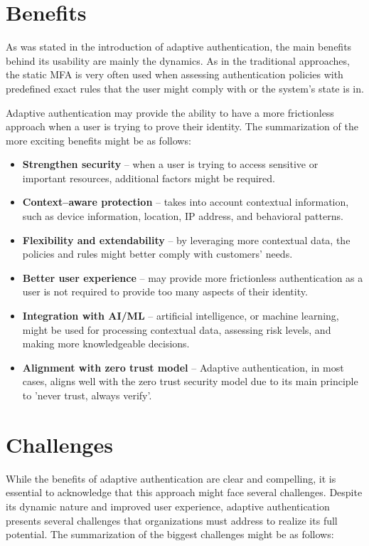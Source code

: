 \section{Benefits}
As was stated in the introduction of adaptive authentication, the main benefits behind its usability are mainly the dynamics.
As in the traditional approaches, the static MFA is very often used when assessing authentication policies with predefined exact rules that the user might comply with or the system's state is in. 

Adaptive authentication may provide the ability to have a more frictionless approach when a user is trying to prove their identity.
\cite{intro-silverfort}\cite{intro-descope}
\newline
\newline
The summarization of the more exciting benefits might be as follows:

\begin{itemize}
    \item \textbf{Strengthen security} -- when a user is trying to access sensitive or important resources, additional factors might be required.
    \item \textbf{Context--aware protection} -- takes into account contextual information, such as device information, location, IP address, and behavioral patterns.
    \item \textbf{Flexibility and extendability} -- by leveraging more contextual data, the policies and rules might better comply with customers' needs.
    \item \textbf{Better user experience} -- may provide more frictionless authentication as a user is not required to provide too many aspects of their identity.
    \item \textbf{Integration with AI/ML} -- artificial intelligence, or machine learning, might be used for processing contextual data, assessing risk levels, and making more knowledgeable decisions.
    \item \textbf{Alignment with zero trust model} -- Adaptive authentication, in most cases, aligns well with the zero trust security model due to its main principle to 'never trust, always verify'. \cite{intro-incognia}
\end{itemize}

\newpage
\section{Challenges}
While the benefits of adaptive authentication are clear and compelling, it is essential to acknowledge that this approach might face several challenges.
Despite its dynamic nature and improved user experience, adaptive authentication presents several challenges that organizations must address to realize its full potential.
\newline
\newline
The summarization of the biggest challenges might be as follows:

